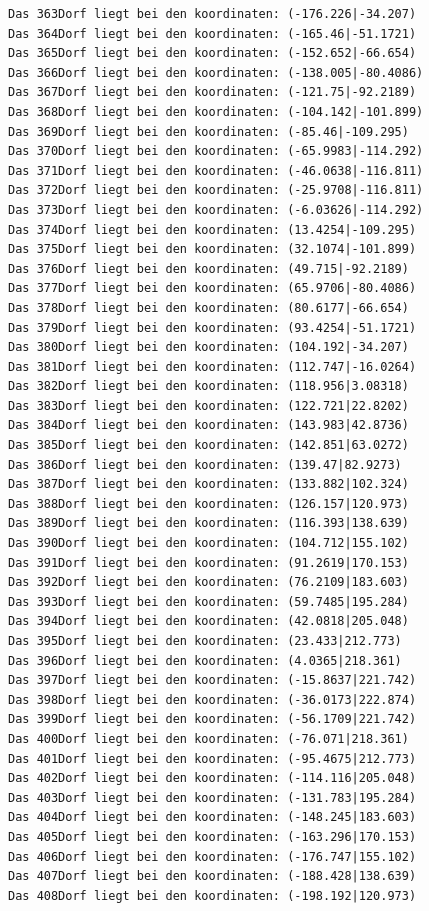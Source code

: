 \documentclass{article}
\begin{document}
\begin{verbatim}
Das 363Dorf liegt bei den koordinaten: (-176.226|-34.207)
Das 364Dorf liegt bei den koordinaten: (-165.46|-51.1721)
Das 365Dorf liegt bei den koordinaten: (-152.652|-66.654)
Das 366Dorf liegt bei den koordinaten: (-138.005|-80.4086)
Das 367Dorf liegt bei den koordinaten: (-121.75|-92.2189)
Das 368Dorf liegt bei den koordinaten: (-104.142|-101.899)
Das 369Dorf liegt bei den koordinaten: (-85.46|-109.295)
Das 370Dorf liegt bei den koordinaten: (-65.9983|-114.292)
Das 371Dorf liegt bei den koordinaten: (-46.0638|-116.811)
Das 372Dorf liegt bei den koordinaten: (-25.9708|-116.811)
Das 373Dorf liegt bei den koordinaten: (-6.03626|-114.292)
Das 374Dorf liegt bei den koordinaten: (13.4254|-109.295)
Das 375Dorf liegt bei den koordinaten: (32.1074|-101.899)
Das 376Dorf liegt bei den koordinaten: (49.715|-92.2189)
Das 377Dorf liegt bei den koordinaten: (65.9706|-80.4086)
Das 378Dorf liegt bei den koordinaten: (80.6177|-66.654)
Das 379Dorf liegt bei den koordinaten: (93.4254|-51.1721)
Das 380Dorf liegt bei den koordinaten: (104.192|-34.207)
Das 381Dorf liegt bei den koordinaten: (112.747|-16.0264)
Das 382Dorf liegt bei den koordinaten: (118.956|3.08318)
Das 383Dorf liegt bei den koordinaten: (122.721|22.8202)
Das 384Dorf liegt bei den koordinaten: (143.983|42.8736)
Das 385Dorf liegt bei den koordinaten: (142.851|63.0272)
Das 386Dorf liegt bei den koordinaten: (139.47|82.9273)
Das 387Dorf liegt bei den koordinaten: (133.882|102.324)
Das 388Dorf liegt bei den koordinaten: (126.157|120.973)
Das 389Dorf liegt bei den koordinaten: (116.393|138.639)
Das 390Dorf liegt bei den koordinaten: (104.712|155.102)
Das 391Dorf liegt bei den koordinaten: (91.2619|170.153)
Das 392Dorf liegt bei den koordinaten: (76.2109|183.603)
Das 393Dorf liegt bei den koordinaten: (59.7485|195.284)
Das 394Dorf liegt bei den koordinaten: (42.0818|205.048)
Das 395Dorf liegt bei den koordinaten: (23.433|212.773)
Das 396Dorf liegt bei den koordinaten: (4.0365|218.361)
Das 397Dorf liegt bei den koordinaten: (-15.8637|221.742)
Das 398Dorf liegt bei den koordinaten: (-36.0173|222.874)
Das 399Dorf liegt bei den koordinaten: (-56.1709|221.742)
Das 400Dorf liegt bei den koordinaten: (-76.071|218.361)
Das 401Dorf liegt bei den koordinaten: (-95.4675|212.773)
Das 402Dorf liegt bei den koordinaten: (-114.116|205.048)
Das 403Dorf liegt bei den koordinaten: (-131.783|195.284)
Das 404Dorf liegt bei den koordinaten: (-148.245|183.603)
Das 405Dorf liegt bei den koordinaten: (-163.296|170.153)
Das 406Dorf liegt bei den koordinaten: (-176.747|155.102)
Das 407Dorf liegt bei den koordinaten: (-188.428|138.639)
Das 408Dorf liegt bei den koordinaten: (-198.192|120.973)

\end{verbatim}
\end{document}
